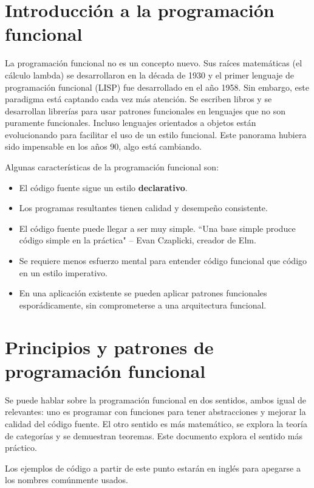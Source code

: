 \documentclass{article}
\begin{document}
\section{Introducción a la programación funcional}
\label{sec:fp-intro}
La programación funcional no es un concepto nuevo. Sus raíces matemáticas (el cálculo lambda) se desarrollaron en la década de 1930 y el primer lenguaje de programación funcional (LISP) fue desarrollado en el año 1958. Sin embargo, este paradigma está captando cada vez más atención. Se escriben libros y se desarrollan librerías para usar patrones funcionales en lenguajes que no son puramente funcionales. Incluso lenguajes orientados a objetos están evolucionando para facilitar el uso de un estilo funcional. Este panorama hubiera sido impensable en los años 90, algo está cambiando.\cite{why-isnt-fp-norm}

Algunas características de la programación funcional son:
\begin{itemize}
  \item El código fuente sigue un estilo \textbf{declarativo}.
  \item Los programas resultantes tienen calidad y desempeño consistente.
  \item El código fuente puede llegar a ser muy simple. ``Una base simple produce código simple en la práctica" \medspace – Evan Czaplicki, creador de Elm\cite{mainstream-elm}.
  \item Se requiere menos esfuerzo mental para entender código funcional que código en un estilo imperativo\cite{skeptics-functional-style}.
  \item En una aplicación existente se pueden aplicar patrones funcionales esporádicamente, sin comprometerse a una arquitectura funcional\cite{skeptics-functional-style}.
\end{itemize}


\section{Principios y patrones de programación funcional}
Se puede hablar sobre la programación funcional en dos sentidos, ambos igual de relevantes: uno es programar con funciones para tener abstracciones y mejorar la calidad del código fuente. El otro sentido es más matemático, se explora la teoría de categorías y se demuestran teoremas. Este documento explora el sentido más práctico.

Los ejemplos de código a partir de este punto estarán en inglés para apegarse a los nombres comúnmente usados.
\end{document}
